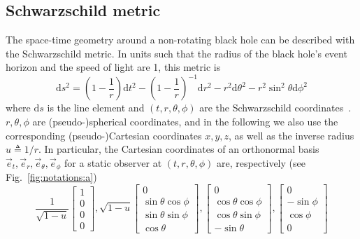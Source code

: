 \documentclass{document}
\newcommand{\diff}{\mathrm d}
\begin{document}
\subsection{Schwarzschild metric}

The space-time geometry around a non-rotating black hole can be described with 
the Schwarzschild metric. In units such that the radius of the black hole's 
event horizon and the speed of light are 1, this metric is
\begin{equation}
\diff s^2 = \left(1 - \frac{1}{r}\right) \diff t^2 -
            \left(1 - \frac{1}{r}\right)^{-1} \diff r^2 -
            r^2 \diff \theta^2 - 
            r^2 \sin^2\theta \diff \phi^2
\label{eq:metric}
\end{equation}
where $\diff s$ is the line element and $(t, r, \theta, \phi)$ are the 
Schwarzschild coordinates~\cite{weinberg1972}. $r, \theta, \phi$ are 
(pseudo-)spherical coordinates, and in the following we also use the 
corresponding (pseudo-)Cartesian coordinates $x,y,z$, as well as the inverse 
radius $u\triangleq 1/r$. In particular, the Cartesian coordinates of an 
orthonormal basis $\vec{e}_t, \vec{e}_r, \vec{e}_\theta, \vec{e}_\phi$ for 
a static observer at $(t, r, \theta, \phi)$ are, respectively (see 
Fig.~\ref{fig:notations:a})
\begin{equation}
\frac{1}{\sqrt{1-u}}
\begin{bmatrix}
  1\\
  0\\
  0\\
  0
\end{bmatrix},
%
\sqrt{1-u}
\begin{bmatrix}
  0\\
  \sin\theta \cos\phi\\
  \sin\theta \sin\phi\\
  \cos\theta
\end{bmatrix},
%
\begin{bmatrix}
  0\\
  \cos\theta \cos\phi\\
  \cos\theta \sin\phi\\
  -\sin\theta
\end{bmatrix},
%
\begin{bmatrix}
  0\\
  -\sin\phi\\
  \cos\phi\\
  0
\end{bmatrix}
\label{eq:staticbasis}
\end{equation}
\end{document}
